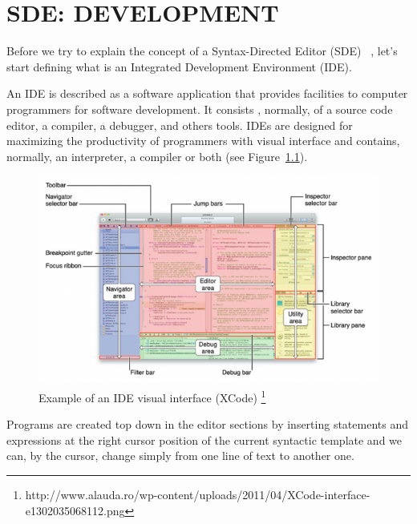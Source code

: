 \documentclass[
  oneside,
  11pt, a4paper,
  footinclude=true,
  headinclude=true,
  cleardoublepage=empty
]{scrbook}
\begin{document}

\chapter{SDE: DEVELOPMENT}

Before we try to explain the concept of a Syntax-Directed Editor (SDE) ~\citep{RT89b,Ko05,alsCH10a,TR81a,RMT86a,RT89a,AHW89}, let's start defining what is an Integrated Development Environment (IDE).

An IDE is described as a software application that provides facilities to computer programmers for software development. It consists , normally, of a source code editor, a compiler, a debugger, and others tools.
IDEs are designed for maximizing the productivity of programmers with visual interface and contains, normally, an interpreter, a compiler or both (see Figure~\ref{fig:ideXCode}).


\begin{figure}[h!]
  \centering
    \includegraphics[width=1\textwidth]{img/XCode-interface.png}
    \caption{Example of an IDE visual interface (XCode) \protect\footnote{http://www.alauda.ro/wp-content/uploads/2011/04/XCode-interface-e1302035068112.png}}
    \label{fig:ideXCode}
\end{figure}

\newpage

Programs are created top down in the editor sections by inserting statements and expressions at the right cursor position of the current syntactic template and we can, by the cursor, change simply from one line of text to another one.
\end{document}
